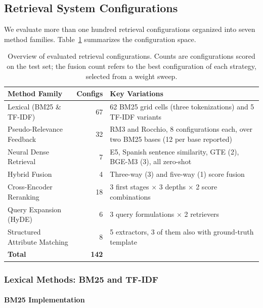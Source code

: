 \documentclass[preprint,review,12pt]{elsarticle}
\begin{document}
\subsection{Retrieval System Configurations}

We evaluate more than one hundred retrieval configurations organized into seven method families. Table~\ref{tab:method_families} summarizes the configuration space.

\begin{table}[ht]
\centering
\caption{Overview of evaluated retrieval configurations. Counts are configurations scored on the test set; the fusion count refers to the best configuration of each strategy, selected from a weight sweep.}
\label{tab:method_families}
\begin{tabular}{lrp{6cm}}
\toprule
\textbf{Method Family} & \textbf{Configs} & \textbf{Key Variations} \\
\midrule
Lexical (BM25 \& TF-IDF) & 67 & 62 BM25 grid cells (three tokenizations) and 5 TF-IDF variants \\
Pseudo-Relevance Feedback & 32 & RM3 and Rocchio, 8 configurations each, over two BM25 bases (12 per base reported) \\
Neural Dense Retrieval & 7 & E5, Spanish sentence similarity, GTE (2), BGE-M3 (3), all zero-shot \\
Hybrid Fusion & 4 & Three-way (3) and five-way (1) score fusion \\
Cross-Encoder Reranking & 18 & 3 first stages $\times$ 3 depths $\times$ 2 score combinations \\
Query Expansion (HyDE) & 6 & 3 query formulations $\times$ 2 retrievers \\
Structured Attribute Matching & 8 & 5 extractors, 3 of them also with ground-truth template \\
\midrule
\textbf{Total} & \textbf{142} & \\
\bottomrule
\end{tabular}
\end{table}

\subsubsection{Lexical Methods: BM25 and TF-IDF}
\label{subsec:lexical_methods}

\paragraph{BM25 Implementation}
\end{document}
